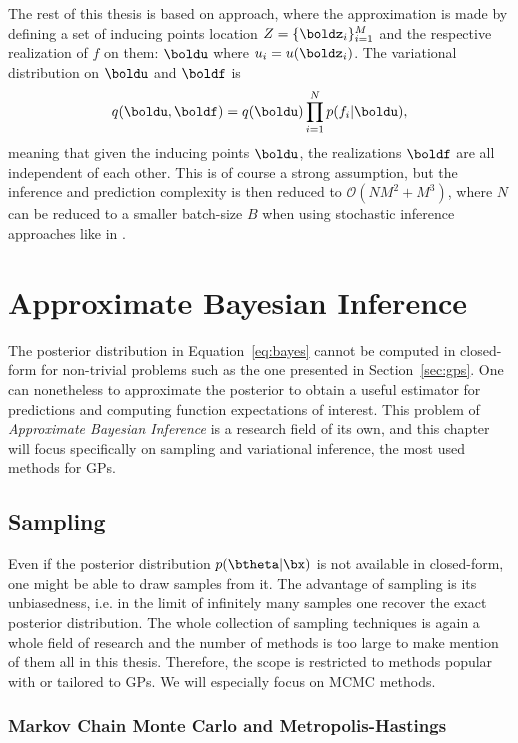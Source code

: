 The rest of this thesis is based on \citet{Titsias2009} approach, where the approximation is made by defining a set of inducing points location $Z=\{\boldz_i\}_{i=1}^M$ and the respective realization of $f$ on them: $\boldu$ where $u_i = u(\boldz_i)$.
The variational distribution on $\boldu$ and $\boldf$ is
\begin{align}
    q(\boldu,\boldf) = q(\boldu)\prod_{i=1}^N p(f_i|\boldu),
    \label{eq:titsias_assumption}
\end{align}
meaning that given the inducing points $\boldu$, the realizations $\boldf$ are all independent of each other.
This is of course a strong assumption, but the inference and prediction complexity is then reduced to $\mathcal{O}(NM^2 + M^3)$, where $N$ can be reduced to a smaller batch-size $B$ when using stochastic inference approaches like in \cite{Hensman2013,Hensman2015}.

\section{Approximate Bayesian Inference}
\label{sec:approx_inf}
The posterior distribution in Equation~\eqref{eq:bayes} cannot be computed in closed-form for non-trivial problems such as the one presented in Section~\ref{sec:gps}.
One can nonetheless to approximate the posterior to obtain a useful estimator for predictions and computing function expectations of interest.
This problem of \textit{Approximate Bayesian Inference} is a research field of its own, and this chapter will focus specifically on sampling and variational inference, the most used methods for \ac{GPs}.

\subsection{Sampling}

Even if the posterior distribution $p(\btheta|\bx)$ is not available in closed-form, one might be able to draw samples from it.
The advantage of sampling is its unbiasedness, i.e. in the limit of infinitely many samples one recover the exact posterior distribution.
The whole collection of sampling techniques is again a whole field of research and the number of methods is too large to make mention of them all in this thesis.
Therefore, the scope is restricted to methods popular with or tailored to \ac{GPs}.
We will especially focus on \ac{MCMC} methods.
\subsubsection{Markov Chain Monte Carlo and Metropolis-Hastings}


